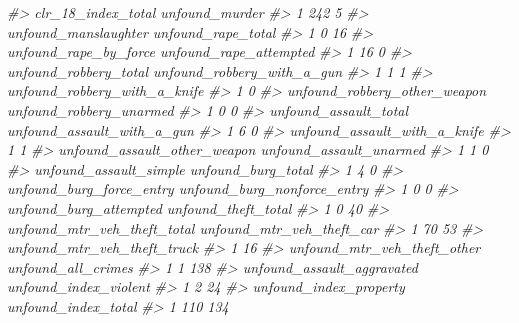 \documentclass[
]{krantz}
\makeatletter
\newenvironment{Shaded}{\begin{snugshade}}{\end{snugshade}}
\newcommand{\CommentTok}[1]{\textcolor[rgb]{0.37,0.37,0.37}{\textit{#1}}}
\newenvironment{kframe}{%
\medskip{}
\setlength{\fboxsep}{.8em}
 \def\at@end@of@kframe{}%
 \ifinner\ifhmode%
  \def\at@end@of@kframe{\end{minipage}}%
  \begin{minipage}{\columnwidth}%
 \fi\fi%
 \def\FrameCommand##1{\hskip\@totalleftmargin \hskip-\fboxsep
 \colorbox{shadecolor}{##1}\hskip-\fboxsep
     \hskip-\linewidth \hskip-\@totalleftmargin \hskip\columnwidth}%
 \MakeFramed {\advance\hsize-\width
   \@totalleftmargin\z@ \linewidth\hsize
   \@setminipage}}%
 {\par\unskip\endMakeFramed%
 \at@end@of@kframe}
\renewenvironment{Shaded}{\begin{kframe}}{\end{kframe}}
\makeatother
\begin{document}
\begin{Shaded}
\begin{Highlighting}[]
\CommentTok{\#\textgreater{}   clr\_18\_index\_total unfound\_murder}
\CommentTok{\#\textgreater{} 1                242              5}
\CommentTok{\#\textgreater{}   unfound\_manslaughter unfound\_rape\_total}
\CommentTok{\#\textgreater{} 1                    0                 16}
\CommentTok{\#\textgreater{}   unfound\_rape\_by\_force unfound\_rape\_attempted}
\CommentTok{\#\textgreater{} 1                    16                      0}
\CommentTok{\#\textgreater{}   unfound\_robbery\_total unfound\_robbery\_with\_a\_gun}
\CommentTok{\#\textgreater{} 1                     1                          1}
\CommentTok{\#\textgreater{}   unfound\_robbery\_with\_a\_knife}
\CommentTok{\#\textgreater{} 1                            0}
\CommentTok{\#\textgreater{}   unfound\_robbery\_other\_weapon unfound\_robbery\_unarmed}
\CommentTok{\#\textgreater{} 1                            0                       0}
\CommentTok{\#\textgreater{}   unfound\_assault\_total unfound\_assault\_with\_a\_gun}
\CommentTok{\#\textgreater{} 1                     6                          0}
\CommentTok{\#\textgreater{}   unfound\_assault\_with\_a\_knife}
\CommentTok{\#\textgreater{} 1                            1}
\CommentTok{\#\textgreater{}   unfound\_assault\_other\_weapon unfound\_assault\_unarmed}
\CommentTok{\#\textgreater{} 1                            1                       0}
\CommentTok{\#\textgreater{}   unfound\_assault\_simple unfound\_burg\_total}
\CommentTok{\#\textgreater{} 1                      4                  0}
\CommentTok{\#\textgreater{}   unfound\_burg\_force\_entry unfound\_burg\_nonforce\_entry}
\CommentTok{\#\textgreater{} 1                        0                           0}
\CommentTok{\#\textgreater{}   unfound\_burg\_attempted unfound\_theft\_total}
\CommentTok{\#\textgreater{} 1                      0                  40}
\CommentTok{\#\textgreater{}   unfound\_mtr\_veh\_theft\_total unfound\_mtr\_veh\_theft\_car}
\CommentTok{\#\textgreater{} 1                          70                        53}
\CommentTok{\#\textgreater{}   unfound\_mtr\_veh\_theft\_truck}
\CommentTok{\#\textgreater{} 1                          16}
\CommentTok{\#\textgreater{}   unfound\_mtr\_veh\_theft\_other unfound\_all\_crimes}
\CommentTok{\#\textgreater{} 1                           1                138}
\CommentTok{\#\textgreater{}   unfound\_assault\_aggravated unfound\_index\_violent}
\CommentTok{\#\textgreater{} 1                          2                    24}
\CommentTok{\#\textgreater{}   unfound\_index\_property unfound\_index\_total}
\CommentTok{\#\textgreater{} 1                    110                 134}
\end{Highlighting}
\end{Shaded}
\end{document}
